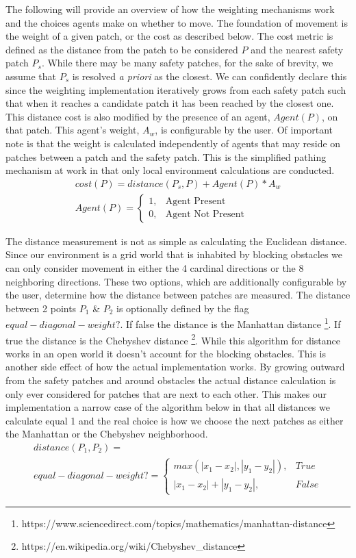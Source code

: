 \documentclass[12pt,letterpaper]{article}
\begin{document}
The following will provide an overview of how the weighting mechanisms work and the choices agents make on whether to move.  The foundation of movement is the weight of a given patch, or the cost as described below. The cost metric is defined as the distance from the patch to be considered $P$ and the nearest safety patch $P_s$.  While there may be many safety patches, for the sake of brevity, we assume that $P_s$ is resolved \emph{a priori} as the closest.  We can confidently declare this since the weighting implementation iteratively grows from each safety patch such that when it reaches a candidate patch it has been reached by the closest one.  This distance cost is also modified by the presence of an agent, $Agent(P)$, on that patch.  This agent's weight, $A_w$, is configurable by the user.  Of important note is that the weight is calculated independently of agents that may reside on patches between a patch and the safety patch.  This is the simplified pathing mechanism at work in that only local environment calculations are conducted.
\begin{align}
cost(P)  = distance(P_s, P) + Agent(P) * A_w \nonumber \\
Agent(P)=
\begin{cases}
1, & \text{Agent Present}  \\
0, & \text{Agent Not Present} 
\end{cases}
\end{align}

The distance measurement is not as simple as calculating the Euclidean distance.  Since our environment is a grid world that is inhabited by blocking obstacles we can only consider movement in either the 4 cardinal directions or the 8 neighboring directions.  These two options, which are additionally configurable by the user, determine how the distance between patches are measured.  The distance between 2 points $P_1$ \& $P_2$ is optionally defined by the flag $equal-diagonal-weight?$.  If false the distance is the Manhattan distance \footnote{ https://www.sciencedirect.com/topics/mathematics/manhattan-distance}. If true the distance is the Chebyshev distance \footnote{https://en.wikipedia.org/wiki/Chebyshev\_distance}. While this algorithm for distance works in an open world it doesn't account for the blocking obstacles.  This is another side effect of how the actual implementation works.  By growing outward from the safety patches and around obstacles the actual distance calculation is only ever considered for patches that are next to each other.  This makes our implementation a narrow case of the algorithm below in that all distances we calculate equal 1 and the real choice is how we choose the next patches as either the Manhattan or the Chebyshev neighborhood.
\begin{align}
distance(P_1, P_2)  = \nonumber\\
equal-diagonal-weight?=
\begin{cases}
	max(|x_1-x_2|, |y_1-y_2|), & True \\
	|x_1-x_2|+ |y_1-y_2|, & False
\end{cases}
\end{align}
\end{document}
